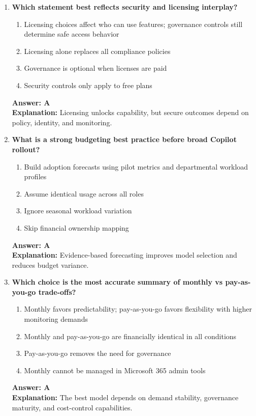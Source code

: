 \documentclass[10pt]{article}
\begin{document}
\begin{enumerate}[leftmargin=*]
\item \textbf{Which statement best reflects security and licensing interplay?}
\begin{enumerate}[label=\Alph*.]
  \item Licensing choices affect who can use features; governance controls still determine safe access behavior
  \item Licensing alone replaces all compliance policies
  \item Governance is optional when licenses are paid
  \item Security controls only apply to free plans
\end{enumerate}
\textbf{Answer: A}\\
\textbf{Explanation:} Licensing unlocks capability, but secure outcomes depend on policy, identity, and monitoring.

\item \textbf{What is a strong budgeting best practice before broad Copilot rollout?}
\begin{enumerate}[label=\Alph*.]
  \item Build adoption forecasts using pilot metrics and departmental workload profiles
  \item Assume identical usage across all roles
  \item Ignore seasonal workload variation
  \item Skip financial ownership mapping
\end{enumerate}
\textbf{Answer: A}\\
\textbf{Explanation:} Evidence-based forecasting improves model selection and reduces budget variance.

\item \textbf{Which choice is the most accurate summary of monthly vs pay-as-you-go trade-offs?}
\begin{enumerate}[label=\Alph*.]
  \item Monthly favors predictability; pay-as-you-go favors flexibility with higher monitoring demands
  \item Monthly and pay-as-you-go are financially identical in all conditions
  \item Pay-as-you-go removes the need for governance
  \item Monthly cannot be managed in Microsoft 365 admin tools
\end{enumerate}
\textbf{Answer: A}\\
\textbf{Explanation:} The best model depends on demand stability, governance maturity, and cost-control capabilities.


\end{enumerate}
\end{document}
